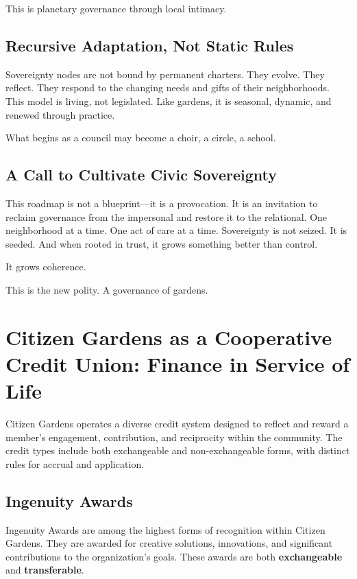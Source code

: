 \documentclass[12pt]{article}
\begin{document}
This is planetary governance through local intimacy.

\subsection{Recursive Adaptation, Not Static Rules}

Sovereignty nodes are not bound by permanent charters. They evolve. They reflect. They respond to the changing needs and gifts of their neighborhoods. This model is living, not legislated. Like gardens, it is seasonal, dynamic, and renewed through practice.

What begins as a council may become a choir, a circle, a school.

\subsection{A Call to Cultivate Civic Sovereignty}

This roadmap is not a blueprint—it is a provocation. It is an invitation to reclaim governance from the impersonal and restore it to the relational. One neighborhood at a time. One act of care at a time. Sovereignty is not seized. It is seeded. And when rooted in trust, it grows something better than control.

It grows coherence.

This is the new polity. A governance of gardens.


\section{Citizen Gardens as a Cooperative Credit Union: Finance in Service of Life}

Citizen Gardens operates a diverse credit system designed to reflect and reward a member's engagement, contribution, and reciprocity within the community. The credit types include both exchangeable and non-exchangeable forms, with distinct rules for accrual and application.

\subsection{Ingenuity Awards}
Ingenuity Awards are among the highest forms of recognition within Citizen Gardens. They are awarded for creative solutions, innovations, and significant contributions to the organization's goals. These awards are both \textbf{exchangeable} and \textbf{transferable}.
\end{document}
